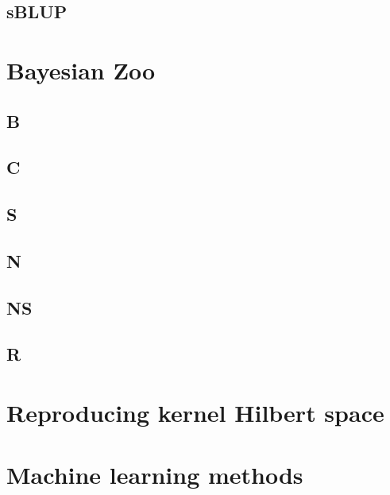 \documentclass[
]{book}
\begin{document}
\hypertarget{sblup}{%
\subsection{sBLUP}\label{sblup}}

\hypertarget{bayesian-zoo}{%
\section{Bayesian Zoo}\label{bayesian-zoo}}

\hypertarget{b}{%
\subsection{B}\label{b}}

\hypertarget{c}{%
\subsection{C}\label{c}}

\hypertarget{s}{%
\subsection{S}\label{s}}

\hypertarget{n}{%
\subsection{N}\label{n}}

\hypertarget{ns}{%
\subsection{NS}\label{ns}}

\hypertarget{r}{%
\subsection{R}\label{r}}

\hypertarget{reproducing-kernel-hilbert-space}{%
\section{Reproducing kernel Hilbert space}\label{reproducing-kernel-hilbert-space}}

\hypertarget{machine-learning-methods}{%
\section{Machine learning methods}\label{machine-learning-methods}}
\end{document}
